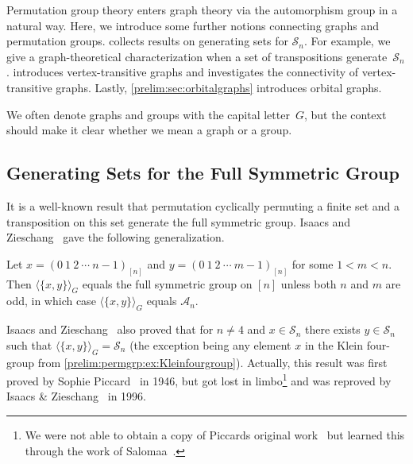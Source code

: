 
Permutation group theory enters graph theory via the automorphism group 
in a natural way. Here, we introduce some further notions
connecting graphs and permutation groups.  collects results on generating sets for $\mathcal S_n$. For example, we give a graph-theoretical
characterization when a set of transpositions generate~$\mathcal S_n$.
introduces vertex-transitive graphs and investigates the connectivity
of vertex-transitive graphs. 
Lastly, \cref{prelim:sec:orbitalgraphs}
introduces orbital graphs.

We often denote graphs and groups
with the capital letter~$G$, but the context
should make it clear whether we mean a graph or a group.


\subsection{Generating Sets for the Full Symmetric Group}
\label{prelim:sec:genSetSn}

It is a well-known result that permutation cyclically permuting a finite set
and a transposition on this set generate the full symmetric group.
Isaacs and Zieschang~\cite[Thm.~B]{IsaacsZ95} gave the following generalization.

\begin{theorem}
	\label{prelim:thm:cycles_gen_Sn}
	Let $x = (0 ~ 1 ~ 2 ~ \cdots ~ n-1)_{[n]}$ and $y = (0 ~ 1 ~ 2 ~ \cdots ~ m-1)_{[n]}$ for some $1 < m < n$.
	Then $\langle \{x,y\} \rangle_G$ equals the full symmetric group on $[n]$ unless both $n$ and $m$ are odd, in which
	case $\langle \{x,y\} \rangle_G$ equals $\mathcal A_n$. %
\end{theorem}

Isaacs and Zieschang~\cite[Thm.~A]{IsaacsZ95} also proved that for $n \ne 4$
and $x \in \mathcal S_n$ there exists $y \in \mathcal S_n$ such that $\langle \{x,y\} \rangle_G = \mathcal S_n$  (the exception being any element $x$ in the Klein four-group from \cref{prelim:permgrp:ex:Kleinfourgroup}).
Actually, this result was first proved by Sophie Piccard~\cite[pp.~80--86]{piccard46} in 1946, 
but got lost in limbo\footnote{We were not able to obtain
	a copy of Piccards original work~\cite{piccard46}
	but learned this through the work of Salomaa~\cite{DBLP:journals/jucs/Salomaa02}.}
and was reproved by Isaacs \& Zieschang~\cite{IsaacsZ95} in 1996.

